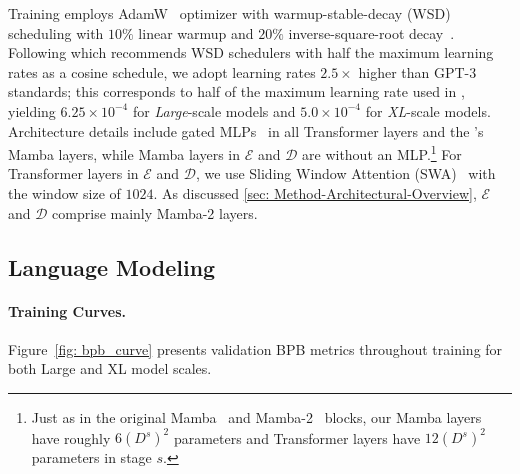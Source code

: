 Training employs AdamW~\citep{AdamW} optimizer with warmup-stable-decay (WSD)~\citep{WSD} scheduling with $10\%$ linear warmup and $20\%$ inverse-square-root decay~\citep{Inverse-Square-Root-Decay}.
Following \citet{hagele2024scaling} which recommends WSD schedulers with half the maximum learning rates as a cosine schedule, we adopt learning rates $2.5\times$ higher than GPT-3~\citep{GPT2} standards; this corresponds to half of the maximum learning rate used in \citet{Mamba}, yielding $6.25 \times 10^{-4}$ for \textit{Large}-scale models and $5.0 \times 10^{-4}$ for \textit{XL}-scale models.
Architecture details include gated MLPs~\citep{Llama2} in all Transformer layers and the \main{}'s Mamba layers, while Mamba layers in $\mathcal{E}$ and $\mathcal{D}$ are without an MLP.\footnote{Just as in the original Mamba~\citep{Mamba} and Mamba-2~\citep{Mamba2} blocks, our Mamba layers have roughly $6(D^s)^2$ parameters and Transformer layers have $12(D^s)^2$ parameters in stage $s$.}
For Transformer layers in $\mathcal{E}$ and $\mathcal{D}$, we use Sliding Window Attention (SWA)~\citep{longformer} with the window size of $1024$.
As discussed \cref{sec: Method-Architectural-Overview}, $\mathcal{E}$ and $\mathcal{D}$ comprise mainly Mamba-2 layers.

\subsection{Language Modeling}

\label{sec: lang}

\paragraph{Training Curves.}



Figure~\ref{fig: bpb_curve} presents validation BPB metrics throughout training for both Large and XL model scales.

